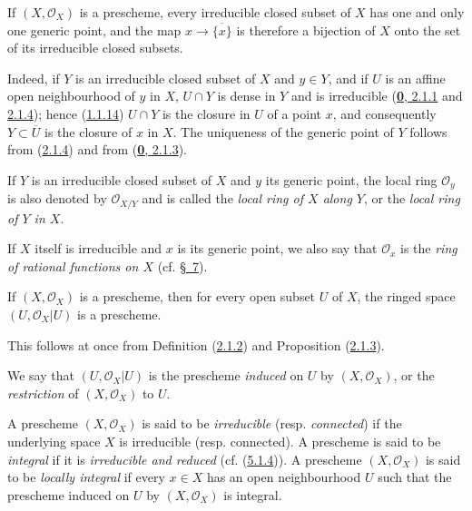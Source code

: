 \begin{proposition}[2.1.5]
\label{I.2.1.5}
If $(X,\mathscr{O}_X)$ is a prescheme, every irreducible closed subset of
$X$ has one and only one generic point, and the map
$x\to\overline{\{x\}}$ is therefore a bijection of $X$ onto the set
of its irreducible closed subsets.
\end{proposition}

Indeed, if $Y$ is an irreducible closed subset of $X$ and $y\in Y$, and if
$U$ is an affine open neighbourhood of $y$ in $X$, $U\cap Y$ is dense in $Y$
and is irreducible
(\hyperref[0.2.1.1]{\textbf{0}, 2.1.1} and
\hyperref[0.2.1.4]{2.1.4}); hence
(\hyperref[I.1.1.14]{1.1.14}) $U\cap Y$ is the closure in $U$ of a
point $x$, and consequently $Y\subset\overline{U}$ is the closure of $x$ in
$X$. The uniqueness of the generic point of $Y$ follows from
(\hyperref[I.2.1.4]{2.1.4}) and from
(\hyperref[0.2.1.3]{\textbf{0}, 2.1.3}).

\begin{env}[2.1.6]
\label{I.2.1.6}
If $Y$ is an irreducible closed subset of $X$ and $y$ its generic point,
the local ring $\mathscr{O}_y$ is also denoted by $\mathscr{O}_{X/Y}$ and is
called the \emph{local ring of $X$ along $Y$}, or the \emph{local ring of $Y$
in $X$}.

If $X$ itself is irreducible and $x$ is its generic point, we also say
that $\mathscr{O}_x$ is the \emph{ring of rational functions on
$X$} (cf. \hyperref[section:I.7]{§~7}).
\end{env}

\begin{proposition}[2.1.7]
\label{I.2.1.7}
If $(X,\mathscr{O}_X)$ is a prescheme, then for every open subset $U$ of
$X$, the ringed space $(U,\mathscr{O}_X|U)$ is a prescheme.
\end{proposition}

This follows at once from Definition (\hyperref[I.2.1.2]{2.1.2}) and
Proposition (\hyperref[I.2.1.3]{2.1.3}).

We say that $(U,\mathscr{O}_X|U)$ is the prescheme \emph{induced} on $U$ by
$(X,\mathscr{O}_X)$, or the \emph{restriction} of $(X,\mathscr{O}_X)$ to $U$.

\begin{env}[2.1.8]
\label{I.2.1.8}
A prescheme $(X,\mathscr{O}_X)$ is said to be \emph{irreducible} (resp.
\emph{connected}) if the underlying space $X$ is irreducible (resp.
connected). A prescheme is said to be \emph{integral} if it is
\emph{irreducible and reduced} (cf. (\hyperref[I.5.1.4]{5.1.4})). A
prescheme $(X,\mathscr{O}_X)$ is said to be \emph{locally integral} if every
$x\in X$ has an open neighbourhood $U$ such that the prescheme induced on $U$
by $(X,\mathscr{O}_X)$ is integral.
\end{env}

